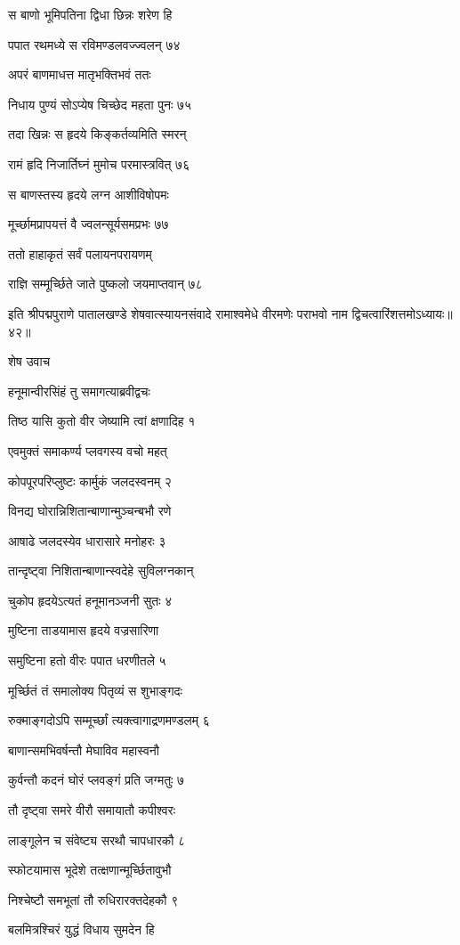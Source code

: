 स बाणो भूमिपतिना द्विधा छिन्नः शरेण हि

पपात रथमध्ये स रविमण्डलवज्ज्वलन् ७४

अपरं बाणमाधत्त मातृभक्तिभवं ततः

निधाय पुण्यं सोऽप्येष चिच्छेद महता पुनः ७५

तदा खिन्नः स हृदये किङ्कर्तव्यमिति स्मरन्

रामं हृदि निजार्तिघ्नं मुमोच परमास्त्रवित् ७६

स बाणस्तस्य हृदये लग्न आशीविषोपमः

मूर्च्छामप्रापयत्तं वै ज्वलन्सूर्यसमप्रभः ७७

ततो हाहाकृतं सर्वं पलायनपरायणम्

राज्ञि सम्मूर्च्छिते जाते पुष्कलो जयमाप्तवान् ७८

इति श्रीपद्मपुराणे पातालखण्डे शेषवात्स्यायनसंवादे रामाश्वमेधे वीरमणेः पराभवो नाम द्विचत्वारिंशत्तमोऽध्यायः॥४२॥


शेष उवाच

हनूमान्वीरसिंहं तु समागत्याब्रवीद्वचः

तिष्ठ यासि कुतो वीर जेष्यामि त्वां क्षणादिह १

एवमुक्तं समाकर्ण्य प्लवगस्य वचो महत्

कोपपूरपरिप्लुष्टः कार्मुकं जलदस्वनम् २

विनद्य घोरान्निशितान्बाणान्मुञ्चन्बभौ रणे

आषाढे जलदस्येव धारासारे मनोहरः ३

तान्दृष्ट्वा निशितान्बाणान्स्वदेहे सुविलग्नकान्

चुकोप हृदयेऽत्यतं हनूमानञ्जनी सुतः ४

मुष्टिना ताडयामास हृदये वज्रसारिणा

समुष्टिना हतो वीरः पपात धरणीतले ५

मूर्च्छितं तं समालोक्य पितृव्यं स शुभाङ्गदः

रुक्माङ्गदोऽपि सम्मूर्च्छां त्यक्त्वागाद्रणमण्डलम् ६

बाणान्समभिवर्षन्तौ मेघाविव महास्वनौ

कुर्वन्तौ कदनं घोरं प्लवङ्गं प्रति जग्मतुः ७

तौ दृष्ट्वा समरे वीरौ समायातौ कपीश्वरः

लाङ्गूलेन च संवेष्ट्य सरथौ चापधारकौ ८

स्फोटयामास भूदेशे तत्क्षणान्मूर्च्छितावुभौ

निश्चेष्टौ समभूतां तौ रुधिरारक्तदेहकौ ९

बलमित्रश्चिरं युद्धं विधाय सुमदेन हि

